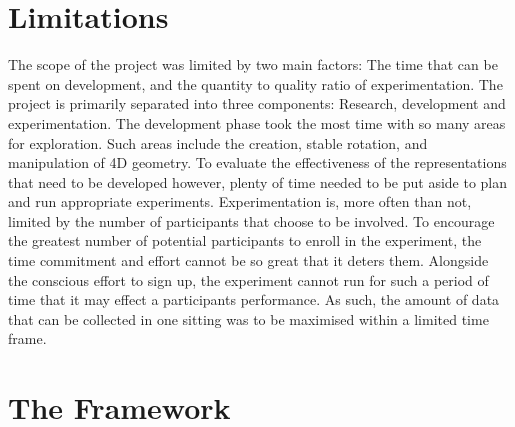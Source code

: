 \documentclass{l4proj}
\begin{document}
\section{Limitations}

The scope of the project was limited by two main factors: The time that can be spent on development, and the quantity to quality ratio of experimentation. 
The project is primarily separated into three components: Research, development and experimentation. The development phase took the most time with so many areas for exploration. Such areas include the creation, stable rotation, and manipulation of 4D geometry. To evaluate the effectiveness of the representations that need to be developed however, plenty of time needed to be put aside to plan and run appropriate experiments.
Experimentation is, more often than not, limited by the number of participants that choose to be involved. To encourage the greatest number of potential participants to enroll in the experiment, the time commitment and effort cannot be so great that it deters them. Alongside the conscious effort to sign up, the experiment cannot run for such a period of time that it may effect a participants performance. As such, the amount of data that can be collected in one sitting was to be maximised within a limited time frame.

\section{The Framework}
\label{requirements_framework}
\end{document}
